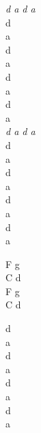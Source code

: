 \begin{chord}
    \textit{d a d a}\\
    d\\
    a\\
    d\\
    a\\
    d\\
    a\\    
    d\\
    a\\
    \textit{d a d a}\\
    d\\
    a\\
    d\\
    a\\
    d\\
    a\\    
    d\\
    a
    
    F g\\
    C d\\
    F g\\
    C d
    
    d\\
    a\\
    d\\
    a\\
    d\\
    a\\    
    d\\
    a    
\end{chord}